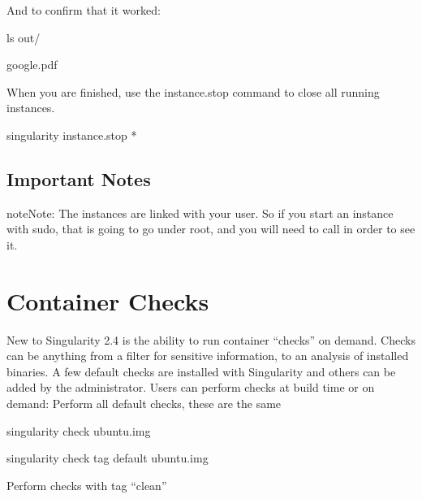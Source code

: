 \documentclass[letterpaper,10pt,english]{sphinxmanual}
\begin{document}
And to confirm that it worked:

%
\begin{sphinxVerbatim}[commandchars=\\\{\}]
\PYGZdl{} ls out/

google.pdf
\end{sphinxVerbatim}

When you are finished, use the instance.stop command to close all
running instances.

%
\begin{sphinxVerbatim}[commandchars=\\\{\}]
\PYGZdl{} singularity instance.stop \PYGZbs{}*
\end{sphinxVerbatim}


\section{Important Notes}
\label{\detokenize{running_services:important-notes}}
\begin{sphinxadmonition}{note}{Note:}
The instances are linked with your user. So if you start an instance
with sudo, that is going to go under root, and you will need to call 
in order to see it.
\end{sphinxadmonition}


\chapter{Container Checks}
\label{\detokenize{container_checks:container-checks}}\label{\detokenize{container_checks::doc}}
New to Singularity 2.4 is the ability to run container “checks” on
demand. Checks can be anything from a filter for sensitive
information, to an analysis of installed binaries. A few default
checks are installed with Singularity and others can be added by the
administrator. Users can perform checks at build time or on demand:
Perform all default checks, these are the same

%
\begin{sphinxVerbatim}[commandchars=\\\{\}]
\PYGZdl{} singularity check ubuntu.img

\PYGZdl{} singularity check \PYGZhy{}\PYGZhy{}tag default ubuntu.img
\end{sphinxVerbatim}

Perform checks with tag “clean”
\end{document}
